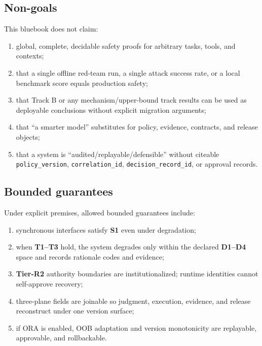 \documentclass[11pt,a4paper]{report}
\begin{document}
\subsection{Non-goals}
This bluebook does not claim:
\begin{enumerate}
  \item global, complete, decidable safety proofs for arbitrary tasks, tools, and contexts;
  \item that a single offline red-team run, a single attack success rate, or a local benchmark score equals production safety;
  \item that Track B or any mechanism/upper-bound track results can be used as deployable conclusions without explicit migration arguments;
  \item that “a smarter model” substitutes for policy, evidence, contracts, and release objects;
  \item that a system is “audited/replayable/defensible” without citeable \texttt{policy\_version}, \texttt{correlation\_id}, \texttt{decision\_record\_id}, or approval records.
\end{enumerate}

\subsection{Bounded guarantees}
Under explicit premises, allowed bounded guarantees include:
\begin{enumerate}
  \item synchronous interfaces satisfy \textbf{S1} even under degradation;
  \item when \textbf{T1--T3} hold, the system degrades only within the declared \textbf{D1--D4} space and records rationale codes and evidence;
  \item \textbf{Tier-R2} authority boundaries are institutionalized; runtime identities cannot self-approve recovery;
  \item three-plane fields are joinable so judgment, execution, evidence, and release reconstruct under one version surface;
  \item if ORA is enabled, OOB adaptation and version monotonicity are replayable, approvable, and rollbackable.
\end{enumerate}
\end{document}
